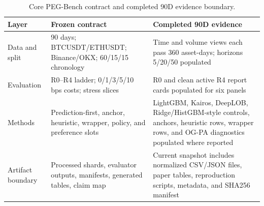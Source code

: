 \begin{table}[t]
\centering
\caption{Core PEG-Bench contract and completed 90D evidence boundary.}
\label{tab:table_01_core_contract}
\begin{tabular}{lll}
\toprule
Layer & Frozen contract & Completed 90D evidence \\
\midrule
Data and split & 90 days; BTCUSDT/ETHUSDT; Binance/OKX; 60/15/15 chronology & Time and volume views each pass 360 asset-days; horizons 5/20/50 populated \\
Evaluation & R0–R4 ladder; 0/1/3/5/10 bps costs; stress slices & R0 and clean active R4 report cards populated for six panels \\
Methods & Prediction-first, anchor, heuristic, wrapper, policy, and preference slots & LightGBM, Kairos, DeepLOB, Ridge/HistGBM-style controls, anchors, heuristic rows, wrapper rows, and OG-PA diagnostics populated where reported \\
Artifact boundary & Processed shards, evaluator outputs, manifests, generated tables, claim map & Current snapshot includes normalized CSV/JSON files, paper tables, reproduction scripts, metadata, and SHA256 manifest \\
\bottomrule
\end{tabular}
\end{table}
